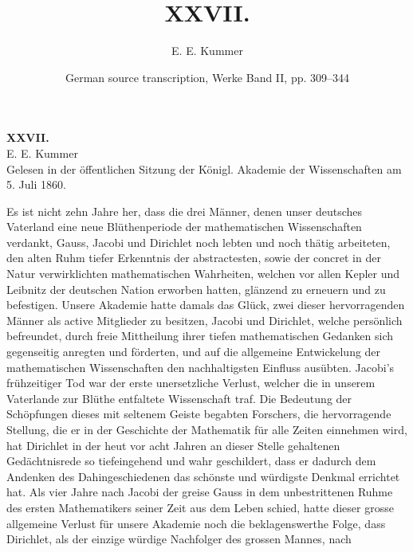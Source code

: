 \documentclass[11pt]{article}
\title{XXVII. }
\author{E. E. Kummer}
\date{German source transcription, Werke Band II, pp. 309--344}
\begin{document}
\maketitle
\begin{center}
{\Large\bfseries XXVII. }\\[0.4em]
{\large E. E. Kummer}\\[0.4em]
{\small Gelesen in der öffentlichen Sitzung der Königl. Akademie der Wissenschaften am 5. Juli 1860.}
\end{center}

\noindent Es ist nicht zehn Jahre her, dass die drei Männer, denen unser deutsches Vaterland eine neue Blüthenperiode der mathematischen Wissenschaften verdankt, Gauss, Jacobi und Dirichlet noch lebten und noch thätig arbeiteten, den alten Ruhm tiefer Erkenntnis der abstractesten, sowie der concret in der Natur verwirklichten mathematischen Wahrheiten, welchen vor allen Kepler und Leibnitz der deutschen Nation erworben hatten, glänzend zu erneuern und zu befestigen. Unsere Akademie hatte damals das Glück, zwei dieser hervorragenden Männer als active Mitglieder zu besitzen, Jacobi und Dirichlet, welche persönlich befreundet, durch freie Mittheilung ihrer tiefen mathematischen Gedanken sich gegenseitig anregten und förderten, und auf die allgemeine Entwickelung der mathematischen Wissenschaften den nachhaltigsten Einfluss ausübten. Jacobi’s frühzeitiger Tod war der erste unersetzliche Verlust, welcher die in unserem Vaterlande zur Blüthe entfaltete Wissenschaft traf. Die Bedeutung der Schöpfungen dieses mit seltenem Geiste begabten Forschers, die hervorragende Stellung, die er in der Geschichte der Mathematik für alle Zeiten einnehmen wird, hat Dirichlet in der heut vor acht Jahren an dieser Stelle gehaltenen Gedächtnisrede so tiefeingehend und wahr geschildert, dass er dadurch dem Andenken des Dahingeschiedenen das schönste und würdigste Denkmal errichtet hat. Als vier Jahre nach Jacobi der greise Gauss in dem unbestrittenen Ruhme des ersten Mathematikers seiner Zeit aus dem Leben schied, hatte dieser grosse allgemeine Verlust für unsere Akademie noch die beklagenswerthe Folge, dass Dirichlet, als der einzige würdige Nachfolger des grossen Mannes, nach
\par
\end{document}
